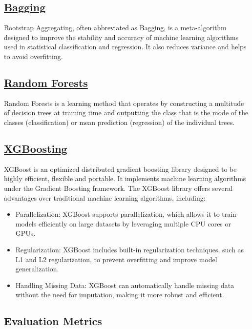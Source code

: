\documentclass[conference]{IEEEtran}
\begin{document}
    \subsection{\href{https://en.wikipedia.org/wiki/Bootstrap_aggregating}{Bagging}}
    Bootstrap Aggregating, often abbreviated as Bagging, is a meta-algorithm designed to improve the stability and accuracy of machine learning algorithms used in statistical classification and regression. It also reduces variance and helps to avoid overfitting.
    \subsection{\href{https://en.wikipedia.org/wiki/Random_forest}{Random Forests}}
    Random Forests is a learning method that operates by constructing a multitude of decision trees at training time and outputting the class that is the mode of the classes (classification) or mean prediction (regression) of the individual trees.
    
    \subsection{\href{https://en.wikipedia.org/wiki/XGBoost}{XGBoosting}}
    XGBoost is an optimized distributed gradient boosting library designed to be highly efficient, flexible and portable. It implements machine learning algorithms under the Gradient Boosting framework. The XGBoost library offers several advantages over traditional machine learning algorithms, including:
        \begin{itemize}
        \item Parallelization: XGBoost supports parallelization, which allows it to train models efficiently on large datasets by leveraging multiple CPU cores or GPUs.
        \item Regularization: XGBoost includes built-in regularization techniques, such as L1 and L2 regularization, to prevent overfitting and improve model generalization.
        \item Handling Missing Data: XGBoost can automatically handle missing data without the need for imputation, making it more robust and efficient.
        \end{itemize}
    
    \subsection*{Evaluation Metrics}
    
\end{document}
